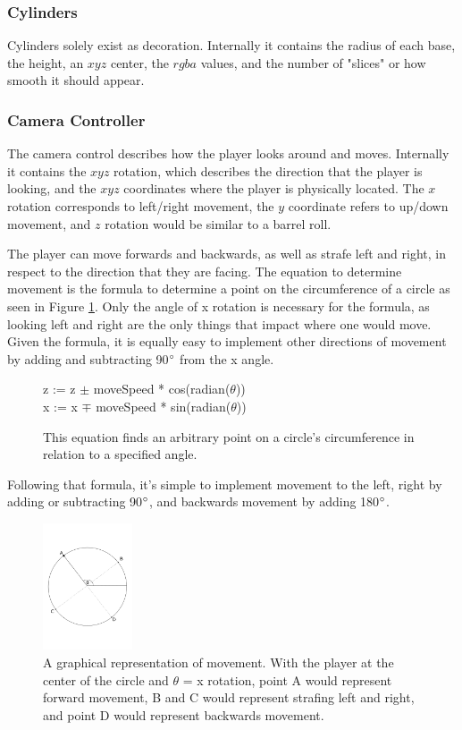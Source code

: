 \documentclass{article}
\begin{document}
\subsubsection{Cylinders} \label{subsubsec:cylinders}

Cylinders solely exist as decoration. Internally it contains the radius of each base, the height, an $xyz$ center, the $rgba$ values, and the number of "slices" or how smooth it should appear.

\subsubsection{Camera Controller} \label{subsubsec:camera}

The camera control describes how the player looks around and moves. Internally it contains the $xyz$ rotation, which describes the direction that the player is looking, and the $xyz$ coordinates where the player is physically located. The $x$ rotation corresponds to left/right movement, the $y$ coordinate refers to up/down movement, and $z$ rotation would be similar to a barrel roll.

The player can move forwards and backwards, as well as strafe left and right, in respect to the direction that they are facing. The equation to determine movement is the formula to determine a point on the circumference of a circle as seen in Figure \ref{fig:circumference}. Only the angle of x rotation is necessary for the formula, as looking left and right are the only things that impact where one would move. Given the formula, it is equally easy to implement other directions of movement by adding and subtracting 90$\degree$ from the x angle.

\begin{figure}[H]

z := z $\pm$ moveSpeed * cos(radian($\theta$)) \\ 
x := x $\mp$ moveSpeed * sin(radian($\theta$))

\caption{This equation finds an arbitrary point on a circle's circumference in relation to a specified angle. \cite{Deyoso} }
\label{fig:circumference}
\end{figure}
Following that formula, it's simple to implement movement to the left, right by adding or subtracting 90$\degree$, and backwards movement by adding 180$\degree$.

\begin{figure}[H]
\includegraphics[width=100px]{circle}
\caption{A graphical representation of movement. With the player at the center of the circle and $\theta$ = x rotation, point A would represent forward movement, B and C would represent strafing left and right, and point D would represent backwards movement.}
\label{fig:circle}
\end{figure}
\end{document}
